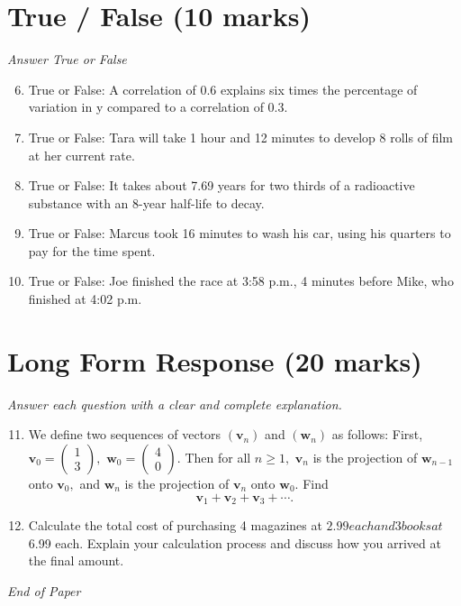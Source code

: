 \documentclass[12pt]{article}
\begin{document}
\section*{True / False (10 marks)}
\textit{Answer True or False}
\begin{enumerate}[label=\arabic*.]
\setcounter{enumi}{5}
\item True or False: A correlation of 0.6 explains six times the percentage of variation in y compared to a correlation of 0.3.
\item True or False: Tara will take 1 hour and 12 minutes to develop 8 rolls of film at her current rate.
\item True or False: It takes about 7.69 years for two thirds of a radioactive substance with an 8-year half-life to decay.
\item True or False: Marcus took 16 minutes to wash his car, using his quarters to pay for the time spent.
\item True or False: Joe finished the race at 3:58 p.m., 4 minutes before Mike, who finished at 4:02 p.m.
\end{enumerate}

\section*{Long Form Response (20 marks)}
\textit{Answer each question with a clear and complete explanation.}
\begin{enumerate}[label=\arabic*.]
\setcounter{enumi}{10}
\item We define two sequences of vectors $(\mathbf{v}_n)$ and $(\mathbf{w}_n)$ as follows: First, $\mathbf{v}_0 = \begin{pmatrix} 1 \\ 3 \end{pmatrix},$ $\mathbf{w}_0 = \begin{pmatrix} 4 \\ 0 \end{pmatrix}.$ Then for all $n \ge 1,$ $\mathbf{v}_n$ is the projection of $\mathbf{w}_{n - 1}$ onto $\mathbf{v}_0,$ and $\mathbf{w}_n$ is the projection of $\mathbf{v}_n$ onto $\mathbf{w}_0.$ Find \[\mathbf{v}_1 + \mathbf{v}_2 + \mathbf{v}_3 + \dotsb.\]
\item Calculate the total cost of purchasing 4 magazines at $2.99 each and 3 books at $6.99 each. Explain your calculation process and discuss how you arrived at the final amount.
\end{enumerate}

\vfill
\noindent\textit{End of Paper}
\end{document}
